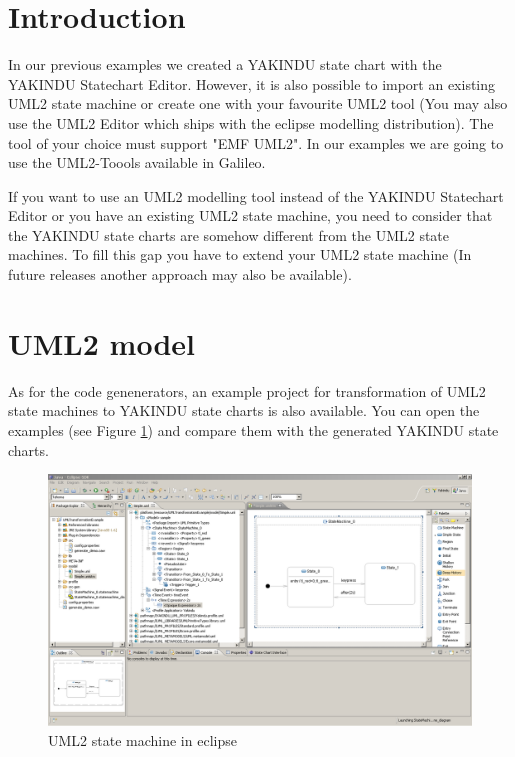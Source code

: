 %
\section{Introduction}
In our previous examples we created a YAKINDU state chart with the YAKINDU
Statechart Editor. However, it is also possible to import an existing UML2
state machine or create one with your favourite UML2 tool (You may also use
the UML2 Editor which ships with the eclipse modelling distribution). The tool
of your choice must support "EMF UML2". In our examples we are going to use
the UML2-Toools available in Galileo.

If you want to use an UML2 modelling tool instead of the YAKINDU Statechart
Editor or you have an existing UML2 state machine, you need to consider that
the YAKINDU state charts are somehow different from the UML2 state machines.
To fill this gap you have to extend your UML2 state machine (In future
releases another approach may also be available).


\section{UML2 model}
As for the code genenerators, an example project for transformation of UML2
state machines to YAKINDU state charts is also available. You can open the
examples (see Figure \ref{fig:uml2tools}) and compare them with the generated
YAKINDU state charts. \begin{figure}[ht]
\center
\includegraphics[width=1\textwidth]{Pictures/uml2tools}
\caption{\label{fig:uml2tools}UML2 state machine in eclipse} 
\end{figure}

